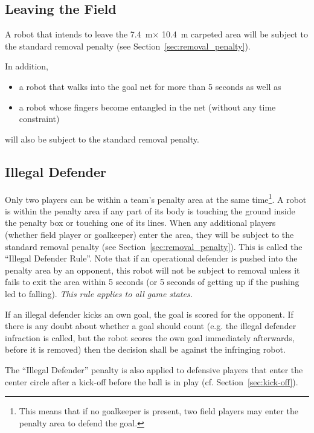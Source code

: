 \documentclass[12pt]{article}
\newcommand{\cf}{\mbox{cf.}\xspace}
\newcommand{\TotalWidth}{7.4~m\xspace}
\newcommand{\TotalLength}{10.4~m\xspace }
\begin{document}
\subsection{Leaving the Field}
\label{sec:leaving_field}

A robot that intends to leave the \TotalWidth $\times$ \TotalLength carpeted area will be subject to the standard removal penalty (see
Section~\ref{sec:removal_penalty}).

In addition, 
\begin{itemize}
\item a robot that walks into the goal net for more than 5 seconds as well as 
\item a robot whose fingers become entangled in the net (without any time constraint)
\end{itemize}
will also be subject to the standard removal penalty.

\subsection{Illegal Defender}
\label{sec:illegal_defender}

Only two players can be within a team's penalty area at the same time\footnote{This means that if no goalkeeper is present, two field players may enter the penalty area to defend the goal.}. A robot is within the penalty area if any part of its body is touching the ground inside the penalty box or touching one of its lines.  When any additional players (whether field player or goalkeeper) enter the area, they will be subject to the standard removal penalty (see Section~\ref{sec:removal_penalty}). This is called the ``Illegal Defender Rule''. Note that if an operational defender is pushed into the penalty area by an opponent, this robot will not be subject to removal unless it fails to exit the area within 5 seconds (or 5 seconds of getting up if the pushing led to falling). \emph{This rule applies to all game states.}

If an illegal defender kicks an own goal, the goal is scored for the opponent. If there is any doubt about whether a goal should count (e.g. the illegal defender infraction is called, but the robot scores the own goal immediately afterwards, before it is removed) then the decision shall be against the infringing robot.

The ``Illegal Defender'' penalty is also applied to defensive players that enter the center circle after a kick-off before the ball is in play (\cf Section~\ref{sec:kick-off}).
\end{document}
